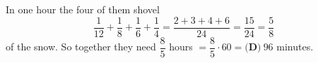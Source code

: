 In one hour the four of them shovel
\[\dfrac1{12}+\dfrac18+\dfrac16+\dfrac14=\dfrac{2+3+4+6}{24}=\dfrac{15}{24}=\dfrac58\]
of the snow. So together they need $\dfrac85$ hours $=\dfrac85\cdot60=\boxed{\textbf{(D)}\ 96}$ minutes.
